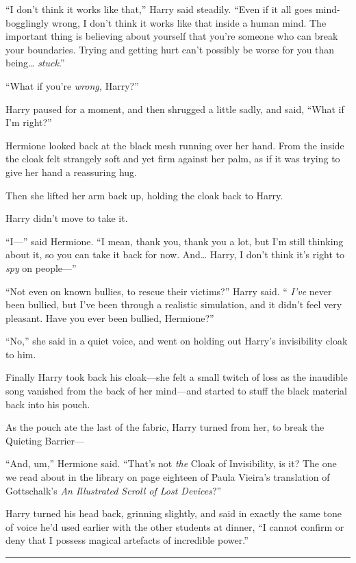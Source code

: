 ``I don't think it works like that,'' Harry said steadily. ``Even if it
all goes mind-bogglingly wrong, I don't think it works like that inside
a human mind. The important thing is believing about yourself that
you're someone who can break your boundaries. Trying and getting hurt
can't possibly be worse for you than being\ldots{} \emph{stuck}.''

``What if you're \emph{wrong,} Harry?''

Harry paused for a moment, and then shrugged a little sadly, and said,
``What if I'm right?''

Hermione looked back at the black mesh running over her hand. From the
inside the cloak felt strangely soft and yet firm against her palm, as
if it was trying to give her hand a reassuring hug.

Then she lifted her arm back up, holding the cloak back to Harry.

Harry didn't move to take it.

``I---'' said Hermione. ``I mean, thank you, thank you a lot, but I'm
still thinking about it, so you can take it back for now. And\ldots{}
Harry, I don't think it's right to \emph{spy} on people---''

``Not even on known bullies, to rescue their victims?'' Harry said. ``
\emph{I've} never been bullied, but I've been through a realistic
simulation, and it didn't feel very pleasant. Have you ever been
bullied, Hermione?''

``No,'' she said in a quiet voice, and went on holding out Harry's
invisibility cloak to him.

Finally Harry took back his cloak---she felt a small twitch of loss as
the inaudible song vanished from the back of her mind---and started to
stuff the black material back into his pouch.

As the pouch ate the last of the fabric, Harry turned from her, to break
the Quieting Barrier---

``And, um,'' Hermione said. ``That's not \emph{the} Cloak of
Invisibility, is it? The one we read about in the library on page
eighteen of Paula Vieira's translation of Gottschalk's \emph{An
Illustrated Scroll of Lost Devices}?''

Harry turned his head back, grinning slightly, and said in exactly the
same tone of voice he'd used earlier with the other students at dinner,
``I cannot confirm or deny that I possess magical artefacts of
incredible power.''

\begin{center}\rule{3in}{0.4pt}\end{center}

